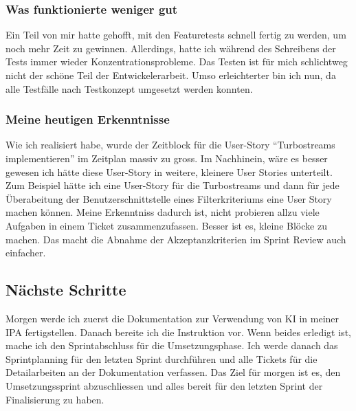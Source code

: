 \subsubsection*{Was funktionierte weniger gut}
Ein Teil von mir hatte gehofft, mit den Featuretests schnell fertig zu werden, um noch mehr Zeit zu gewinnen. Allerdings, hatte ich während des Schreibens der Tests
immer wieder Konzentrationsprobleme. Das Testen ist für mich schlichtweg nicht der schöne Teil der Entwickelerarbeit. Umso erleichterter bin ich nun, 
da alle Testfälle nach Testkonzept umgesetzt werden konnten. 

\subsubsection*{Meine heutigen Erkenntnisse}
Wie ich realisiert habe, wurde der Zeitblock für die User-Story ``Turbostreams implementieren'' im Zeitplan massiv zu gross. Im Nachhinein, wäre es 
besser gewesen ich hätte diese User-Story in weitere, kleinere User Stories unterteilt. Zum Beispiel hätte ich 
eine User-Story für die Turbostreams und dann für jede Überabeitung der Benutzerschnittstelle eines Filterkriteriums eine User Story machen können.
Meine Erkenntniss dadurch ist, nicht probieren allzu viele Aufgaben in einem Ticket zusammenzufassen. Besser ist es, kleine Blöcke zu machen.
Das macht die Abnahme der Akzeptanzkriterien im Sprint Review auch einfacher.

\subsection*{Nächste Schritte}
Morgen werde ich zuerst die Dokumentation zur Verwendung von KI in meiner IPA fertigstellen.
Danach bereite ich die Instruktion vor. Wenn beides erledigt ist, mache ich den Sprintabschluss für die Umsetzungsphase. 
Ich werde danach das Sprintplanning für den letzten Sprint durchführen und alle Tickets für die Detailarbeiten an der Dokumentation verfassen.
Das Ziel für morgen ist es, den Umsetzungssprint abzuschliessen und alles bereit für den letzten Sprint der Finalisierung zu haben.

\pagebreak
